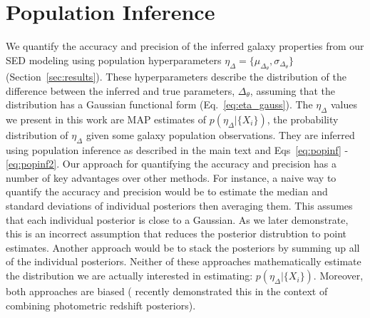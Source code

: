 \section{Population Inference} \label{sec:hyper}
We quantify the accuracy and precision of the inferred galaxy properties from
our SED modeling using population hyperparameters 
$\eta_{\Delta} = \{\mu_{\Delta_\theta}, \sigma_{\Delta_\theta}\}$ 
(Section~\ref{sec:results}). 
These hyperparameters describe the distribution of the difference between the
inferred and true parameters, $\Delta_{\theta}$, assuming that the distribution
has a Gaussian functional form (Eq.~\ref{eq:eta_gauss}). 
The $\eta_\Delta$ values we present in this work are MAP estimates of
$p(\eta_\Delta | \{ X_i \})$, the probability distribution of $\eta_\Delta$
given some galaxy population observations. 
They are inferred using population inference as described in the main text and
Eqs~\ref{eq:popinf} - \ref{eq:popinf2}.
Our approach for quantifying the accuracy and precision has a number of key
advantages over other methods. 
For instance, a naive way to quantify the accuracy and precision would be to
estimate the median and standard deviations of individual posteriors then
averaging them. 
This assumes that each individual posterior is close to a Gaussian. 
As we later demonstrate, this is an incorrect assumption that reduces the
posterior distrubtion to point estimates. 
Another approach would be to stack the posteriors by summing up all of the
individual posteriors. 
Neither of these approaches mathematically estimate the distribution we are
actually interested in estimating: $p(\eta_\Delta | \{ X_i \})$. 
Moreover, both approaches are biased (\citealt{malz2020} recently demonstrated
this in the context of combining photometric redshift posteriors). 

